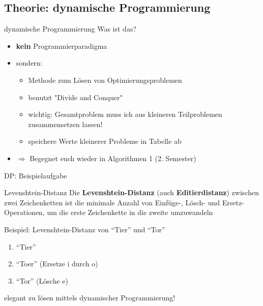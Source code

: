\documentclass[18pt]{beamer}
\begin{document}
\subsection{Theorie: dynamische Programmierung}
\begin{frame}{dynamische Programmierung}
Was ist das?
	\begin{itemize}
    \item \textbf{kein} Programmierparadigma
    \item sondern:
    \begin{itemize}
      \item Methode zum Lösen von Optimierungsproblemen
      \item benutzt "Divide and Conquer"
      \item wichtig: Gesamtproblem muss ich aus kleineren Teilproblemen zusammensetzen lassen!
      \item speichere Werte kleinerer Probleme in Tabelle ab
    \end{itemize}
    \item[] $\Rightarrow$ Begegnet euch wieder in Algorithmen 1 (2. Semester)
  \end{itemize}
\end{frame}

\begin{frame}{DP: Beispielaufgabe}
	\begin{block}{Levenshtein-Distanz}
    Die \textbf{Levenshtein-Distanz} (auch \textbf{Editierdistanz}) zwischen zwei Zeichenketten ist die minimale Anzahl von \textcolor[rgb]{0,0,1}{Einfüge}-, \textcolor[rgb]{0,0,1}{Lösch-} und \textcolor[rgb]{0,0,1}{Ersetz}-Operationen, um die erste Zeichenkette in die zweite umzuwandeln
  \end{block}
  \pause
  Beispiel: Levenshtein-Distanz von \textcolor[rgb]{0,0.58,0}{"`Tier"'} und \textcolor[rgb]{0,0.58,0}{"`Tor"'}
  \begin{enumerate}
    \item \textcolor[rgb]{0,0.58,0}{"`Tier"'}
    \item \textcolor[rgb]{0,0.58,0}{"`Toer"'} (Ersetze i durch o)
    \item \textcolor[rgb]{0,0.58,0}{"`Tor"'} (Lösche e)
  \end{enumerate}
  \pause
  elegant zu lösen mittels dynamischer Programmierung!
\end{frame}
\end{document}

